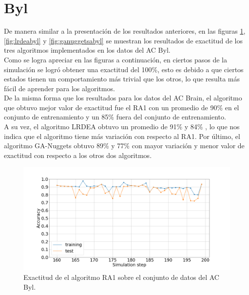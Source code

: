 \section{Byl}
De manera similar a la presentación de los resultados anteriores, en las figuras \ref{fig:ra1byl}, \ref{fig:lrdeabyl} y \ref{fig:ganuggetsabyl} se muestran los resultados de exactitud de los tres algoritmos implementados en los datos del AC Byl.
\\

Como se logra apreciar en las figuras a continuación, en ciertos pasos de la simulación se logró obtener una exactitud del 100\%, esto es debido a que ciertos estados tienen un comportamiento más trivial que los otros, lo que resulta más fácil de aprender para los algoritmos.
\\

De la misma forma que los resultados para los datos del AC Brain, el algoritmo que obtuvo mejor valor de exactitud fue el RA1 con un promedio de 90\% en el conjunto de entrenamiento y un 85\% fuera del conjunto de entrenamiento.
\\

A su vez, el algoritmo LRDEA obtuvo un promedio de 91\% y 84\% , lo que nos indica que el algoritmo tiene más variación con respecto al RA1. Por último, el algoritmo GA-Nuggets obtuvo 89\% y 77\% con mayor variación y menor valor de exactitud con respecto a los otros dos algoritmos.
\begin{figure}[H]
	\centering
	\includegraphics[width=\linewidth]{fig/ra1_3}
	\caption{Exactitud de el algoritmo RA1 sobre el conjunto de datos del AC Byl.}
	\label{fig:ra1byl}
\end{figure}

